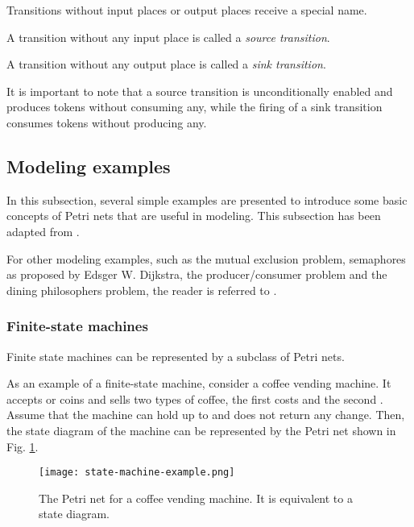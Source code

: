 Transitions without input places or output places receive a special name.

\begin{definition}
    A transition without any input place is called a \textit{source transition}.
\end{definition}

\begin{definition}
    A transition without any output place is called a \textit{sink transition}.
\end{definition}

It is important to note that a source transition is unconditionally enabled
and produces tokens without consuming any, while the firing of a sink transition
consumes tokens without producing any.

\subsection{Modeling examples}

In this subsection, several simple examples are presented to introduce
some basic concepts of Petri nets that are useful in modeling.
This subsection has been adapted from \cite{murata1989}.

For other modeling examples, such as the mutual exclusion problem,
semaphores as proposed by Edsger W. Dijkstra, the producer/consumer problem
and the dining philosophers problem, the reader is referred to \cite[Chapter 3]{peterson1981}.

\subsubsection{Finite-state machines}

Finite state machines can be represented by a subclass of Petri nets.

As an example of a finite-state machine, consider a coffee vending machine.
It accepts  or  coins and sells two types of coffee, the first costs  and the second .
Assume that the machine can hold up to  and does not return any change.
Then, the state diagram of the machine can be represented by the Petri net shown in Fig. \ref{fig:state-machine-example}.

\begin{figure}[H]
    \centering
    \texttt{[image: state-machine-example.png]}
    \caption{The Petri net for a coffee vending machine. It is equivalent to a state diagram.}
    \label{fig:state-machine-example}
\end{figure}


